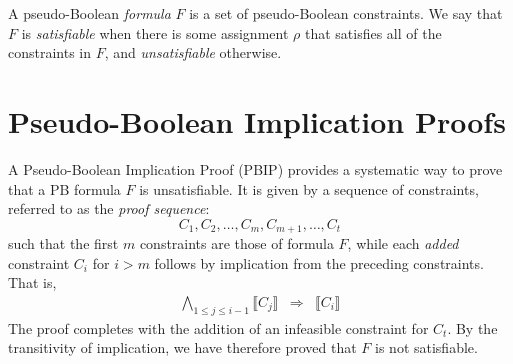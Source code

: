 \documentclass{easychair}
\renewcommand{\obar}[1]{\overline{#1}}
\newcommand{\lit}{\ell}
\newcommand{\assign}{\rho}
\newcommand{\imply}{\Rightarrow}
\newcommand{\func}[1]{\llbracket#1\rrbracket}
\begin{document}


A pseudo-Boolean {\em formula} $F$ is a set of pseudo-Boolean
constraints.  We say that $F$ is {\em satisfiable} when there is some
assignment $\assign$ that satisfies all of the constraints in $F$, and
{\em unsatisfiable} otherwise.  


\section{Pseudo-Boolean Implication Proofs}

A Pseudo-Boolean Implication Proof (PBIP) provides a systematic way to
prove that a PB formula $F$ is unsatisfiable.  It is given by a sequence of constraints, referred to as the {\em proof sequence}:
\begin{displaymath}
  C_1, C_2, \ldots, C_m, C_{m+1}, \ldots, C_t
\end{displaymath}  
such that the first $m$ constraints are those of formula $F$, while each {\em added} constraint $C_i$
for  $i > m$ follows by implication from the preceding constraints.
That is, 
\begin{eqnarray}
\bigwedge_{1 \leq j \leq i-1} \func{C_j} & \imply & \func{C_i} \label{eqn:proofsequence}
\end{eqnarray}
The proof completes with the addition of an infeasible constraint for $C_t$.
By the transitivity of implication, we have therefore proved that $F$ is not satisfiable.
\end{document}
